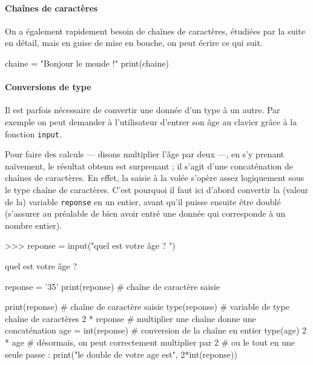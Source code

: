 \paragraph{Chaînes de caractères} On a également rapidement besoin de chaînes de caractères, étudiées par la suite en détail, mais en guise de mise en bouche, on peut écrire ce qui suit.

\begin{idleconsole}[after skip=7pt]
	\begin{pyconsole}
		chaine = "Bonjour le monde !"
		print(chaine)
	\end{pyconsole}
\end{idleconsole}

\paragraph{Conversions de type} Il est parfois nécessaire de convertir une donnée d'un type à un autre. Par exemple on peut demander à l'utilisateur d'entrer son âge au clavier grâce à la fonction \texttt{input}. 

Pour faire des calculs --- disons multiplier l'âge par deux ---, en s'y prenant naïvement, le résultat obtenu est surprenant ; il s'agit d'une concaténation de chaînes de caractères. En effet, la saisie à la volée s'opère assez logiquement sous le type chaîne de caractères. 
C'est pourquoi il faut ici d'abord convertir la (valeur de la) variable \texttt{reponse} en un entier, avant qu'il puisse ensuite être doublé (s'assurer au préalable de bien avoir entré une donnée qui corresponde à un nombre entier).

\begin{idleconsole}[after skip=6pt]
	\begin{pyverbatim}
		>>> reponse = input("quel est votre âge ? ")
	\end{pyverbatim}
	\vspace{-0.4\baselineskip}
	\textcolor{idleoutputcolor}{quel est votre âge ?}
	\begin{pycode}
		reponse = '35'
		print(reponse) # chaîne de caractère saisie
	\end{pycode}
	\vspace{-0.25\baselineskip}
	\begin{pyconsole}
		print(reponse) # chaîne de caractère saisie
		type(reponse)  # variable de type chaîne de caractères
		2 * reponse    # multiplier une chaîne donne une concaténation
		age = int(reponse) # conversion de la chaîne en entier
		type(age)
		2 * age # désormais, on peut correctement multiplier par 2
		# ou le tout en une seule passe :
		print("le double de votre age est", 2*int(reponse))
	\end{pyconsole}
\end{idleconsole}

